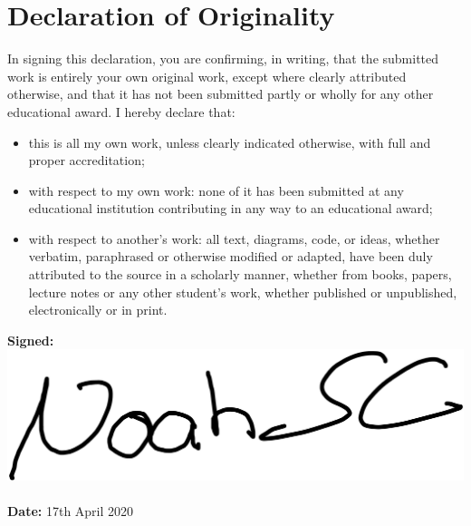 \documentclass[12pt,pdftex,titlepage]{report}
\begin{document}
    \chapter*{Declaration of Originality}
        \begin{spacing}{1.0}
            In signing this declaration, you are confirming, in writing, that the submitted work
            is entirely your own original work, except where clearly attributed otherwise, and
            that it has not been submitted partly or wholly for any other educational award. I
            hereby declare that:
            \begin{itemize}
                \item this is all my own work, unless clearly indicated otherwise, with full and proper accreditation;  
                \item with respect to my own work: none of it has been submitted at any educational institution contributing in any way to an educational award;
                \item with respect to another’s work: all text, diagrams, code, or ideas, whether verbatim, paraphrased or otherwise modified or adapted, 
                have been duly attributed to the source in a scholarly manner, whether from books, papers, lecture notes or any other student’s work, whether
                published or unpublished, electronically or in print.
            \end{itemize}
            \vspace{10mm}
            \textbf{Signed:} \includegraphics[height=1.8\baselineskip]{sig.eps}
            \\\\
            \textbf{Date:} 17th April 2020
        \end{spacing}
\end{document}
